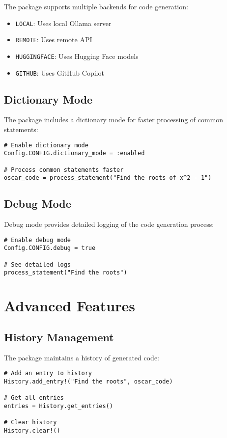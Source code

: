 \documentclass[11pt,a4paper]{article}
\begin{document}
The package supports multiple backends for code generation:

\begin{itemize}
    \item \texttt{LOCAL}: Uses local Ollama server
    \item \texttt{REMOTE}: Uses remote API
    \item \texttt{HUGGINGFACE}: Uses Hugging Face models
    \item \texttt{GITHUB}: Uses GitHub Copilot
\end{itemize}

\subsection{Dictionary Mode}

The package includes a dictionary mode for faster processing of common statements:

\begin{lstlisting}
# Enable dictionary mode
Config.CONFIG.dictionary_mode = :enabled

# Process common statements faster
oscar_code = process_statement("Find the roots of x^2 - 1")
\end{lstlisting}

\subsection{Debug Mode}

Debug mode provides detailed logging of the code generation process:

\begin{lstlisting}
# Enable debug mode
Config.CONFIG.debug = true

# See detailed logs
process_statement("Find the roots")
\end{lstlisting}

\section{Advanced Features}

\subsection{History Management}

The package maintains a history of generated code:

\begin{lstlisting}
# Add an entry to history
History.add_entry!("Find the roots", oscar_code)

# Get all entries
entries = History.get_entries()

# Clear history
History.clear!()
\end{lstlisting}
\end{document}
